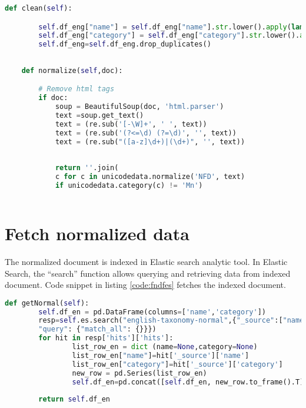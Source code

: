 \begin{lstlisting}[language=Python,caption={Function to normalize text and remove duplicate},label={code:nt}]
    def clean(self):

        self.df_eng["name"]	= self.df_eng["name"].str.lower().apply(lambda n:self.normalize(n)) 
        self.df_eng["category"]	= self.df_eng["category"].str.lower().apply(lambda c:self.normalize(c))
        self.df_eng=self.df_eng.drop_duplicates()
       
    
    def normalize(self,doc):

        # Remove html tags 
        if doc:
            soup = BeautifulSoup(doc, 'html.parser')
            text =soup.get_text()
            text = (re.sub('[-\W]+', ' ', text))
            text = (re.sub('(?<=\d) (?=\d)', '', text))
            text = (re.sub("([a-z]\d+)|(\d+)", '', text))
            
            
            return ''.join(
            c for c in unicodedata.normalize('NFD', text)
            if unicodedata.category(c) != 'Mn')
      
\end{lstlisting}

\section{Fetch normalized data}
The normalized document is indexed in Elastic search analytic tool. In Elastic Search, the ``search'' function allows querying and retrieving data from indexed document. Code snippet in listing \ref{code:fndfes} fetches the indexed document. 

\begin{lstlisting}[language=Python,caption={Fetch normalized data from Elastic search},label={code:fndfes}]
    def getNormal(self):
        self.df_en = pd.DataFrame(columns=['name','category'])
        resp=self.es.search("english-taxonomy-normal",{"_source":["name","category"],                                  'size' : 5000,
        "query": {"match_all": {}}})
        for hit in resp['hits']['hits']:
                list_row_en = dict (name=None,category=None)            
                list_row_en["name"]=hit['_source']['name']             
                list_row_en["category"]=hit['_source']['category']
                new_row = pd.Series(list_row_en)
                self.df_en=pd.concat([self.df_en, new_row.to_frame().T], ignore_index=True)
        
        return self.df_en
      
\end{lstlisting}
